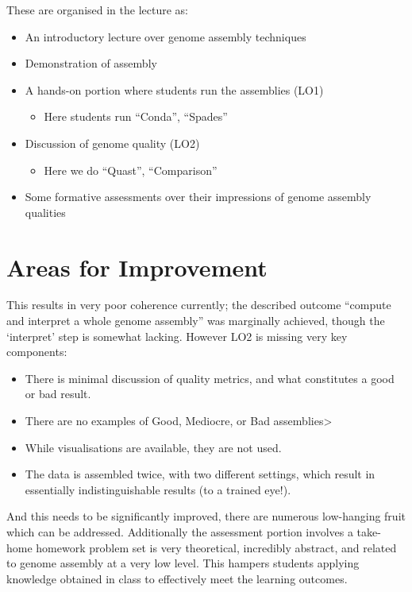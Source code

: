\documentclass[paper=a4,justified,a4paper]{tufte-handout}
\providecommand{\tightlist}{%
  \setlength{\itemsep}{0pt}\setlength{\parskip}{0pt}}
\begin{document}
These are organised in the lecture as:

\begin{itemize}
\tightlist
\item
  An introductory lecture over genome assembly techniques
\item
  Demonstration of assembly
\item
  A hands-on portion where students run the assemblies (LO1)

  \begin{itemize}
  \tightlist
  \item
    Here students run ``Conda'', ``Spades''
  \end{itemize}
\item
  Discussion of genome quality (LO2)

  \begin{itemize}
  \tightlist
  \item
    Here we do ``Quast'', ``Comparison''
  \end{itemize}
\item
  Some formative assessments over their impressions of genome assembly
  qualities
\end{itemize}

\hypertarget{areas-for-improvement}{%
\section{Areas for Improvement}\label{areas-for-improvement}}

This results in very poor coherence currently; the described outcome
``compute and interpret a whole genome assembly'' was marginally
achieved, though the `interpret' step is somewhat lacking. However LO2
is missing very key components:

\begin{itemize}
\tightlist
\item
  There is minimal discussion of quality metrics, and what constitutes a
  good or bad result.
\item
  There are no examples of Good, Mediocre, or Bad
  assemblies\textgreater{}
\item
  While visualisations are available, they are not used.
\item
  The data is assembled twice, with two different settings, which result
  in essentially indistinguishable results (to a trained eye!).
\end{itemize}

And this needs to be significantly improved, there are numerous
low-hanging fruit which can be addressed. Additionally the assessment
portion involves a take-home homework problem set is very theoretical,
incredibly abstract, and related to genome assembly at a very low level.
This hampers students applying knowledge obtained in class to
effectively meet the learning outcomes.
\end{document}
